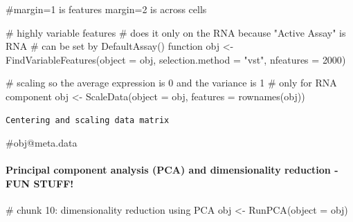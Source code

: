 \documentclass[
  letterpaper,
  DIV=11,
  numbers=noendperiod]{scrartcl}
\let\oldparagraph\paragraph
\renewcommand{\paragraph}[1]{\oldparagraph{#1}\mbox{}}
\newenvironment{Shaded}{\begin{snugshade}}{\end{snugshade}}
\newcommand{\AttributeTok}[1]{\textcolor[rgb]{0.40,0.45,0.13}{#1}}
\newcommand{\CommentTok}[1]{\textcolor[rgb]{0.37,0.37,0.37}{#1}}
\newcommand{\DecValTok}[1]{\textcolor[rgb]{0.68,0.00,0.00}{#1}}
\newcommand{\FunctionTok}[1]{\textcolor[rgb]{0.28,0.35,0.67}{#1}}
\newcommand{\NormalTok}[1]{\textcolor[rgb]{0.00,0.23,0.31}{#1}}
\newcommand{\OtherTok}[1]{\textcolor[rgb]{0.00,0.23,0.31}{#1}}
\newcommand{\StringTok}[1]{\textcolor[rgb]{0.13,0.47,0.30}{#1}}
\begin{document}
\begin{Shaded}
\begin{Highlighting}[]
\CommentTok{\#margin=1 is features margin=2 is across cells}

\CommentTok{\# highly variable features}
\CommentTok{\# does it only on the RNA because "Active Assay" is RNA}
\CommentTok{\# can be set by DefaultAssay() function}
\NormalTok{obj }\OtherTok{\textless{}{-}} \FunctionTok{FindVariableFeatures}\NormalTok{(}\AttributeTok{object =}\NormalTok{ obj, }\AttributeTok{selection.method =} \StringTok{"vst"}\NormalTok{,}
                            \AttributeTok{nfeatures =} \DecValTok{2000}\NormalTok{)}

\CommentTok{\# scaling so the average expression is 0 and the variance is 1}
\CommentTok{\# only for RNA component }
\NormalTok{obj }\OtherTok{\textless{}{-}} \FunctionTok{ScaleData}\NormalTok{(}\AttributeTok{object =}\NormalTok{ obj, }\AttributeTok{features =} \FunctionTok{rownames}\NormalTok{(obj))}
\end{Highlighting}
\end{Shaded}

\begin{verbatim}
Centering and scaling data matrix
\end{verbatim}

\begin{Shaded}
\begin{Highlighting}[]
\CommentTok{\#obj@meta.data}
\end{Highlighting}
\end{Shaded}

\hypertarget{principal-component-analysis-pca-and-dimensionality-reduction--fun-stuff}{%
\paragraph{Principal component analysis (PCA) and dimensionality
reduction -FUN
STUFF!}\label{principal-component-analysis-pca-and-dimensionality-reduction--fun-stuff}}

\begin{Shaded}
\begin{Highlighting}[]
\CommentTok{\# chunk 10: dimensionality reduction using PCA}
\NormalTok{obj }\OtherTok{\textless{}{-}} \FunctionTok{RunPCA}\NormalTok{(}\AttributeTok{object =}\NormalTok{ obj)}
\end{Highlighting}
\end{Shaded}
\end{document}
